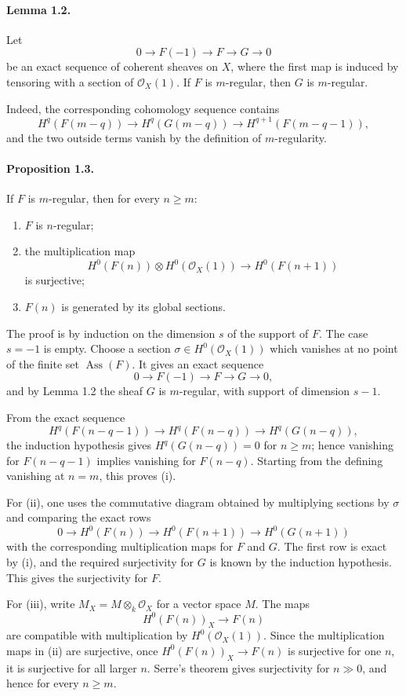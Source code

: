 \documentclass[12pt]{article}
\newcommand{\cO}{\mathcal O}
\newcommand{\longto}{\longrightarrow}
\begin{document}
\paragraph{Lemma 1.2.}
Let
\[
0\to F(-1)\to F\to G\to0
\]
be an exact sequence of coherent sheaves on $X$, where the first map is induced by tensoring with a section of $\cO_X(1)$. If $F$ is $m$-regular, then $G$ is $m$-regular.

Indeed, the corresponding cohomology sequence contains
\[
H^q(F(m-q))\to H^q(G(m-q))\to H^{q+1}(F(m-q-1)),
\]
and the two outside terms vanish by the definition of $m$-regularity.

\paragraph{Proposition 1.3.}
If $F$ is $m$-regular, then for every $n\geq m$:
\begin{enumerate}[label=\roman*)]
\item $F$ is $n$-regular;
\item the multiplication map
\[
H^0(F(n))\otimes H^0(\cO_X(1))\longto H^0(F(n+1))
\]
is surjective;
\item $F(n)$ is generated by its global sections.
\end{enumerate}

The proof is by induction on the dimension $s$ of the support of $F$. The case $s=-1$ is empty. Choose a section $\sigma\in H^0(\cO_X(1))$ which vanishes at no point of the finite set $\operatorname{Ass}(F)$. It gives an exact sequence
\[
0\to F(-1)\to F\to G\to0,
\]
and by Lemma 1.2 the sheaf $G$ is $m$-regular, with support of dimension $s-1$.

From the exact sequence
\[
H^q(F(n-q-1))\to H^q(F(n-q))\to H^q(G(n-q)),
\]
the induction hypothesis gives $H^q(G(n-q))=0$ for $n\geq m$; hence vanishing for $F(n-q-1)$ implies vanishing for $F(n-q)$. Starting from the defining vanishing at $n=m$, this proves (i).

For (ii), one uses the commutative diagram obtained by multiplying sections by $\sigma$ and comparing the exact rows
\[
0\to H^0(F(n))\to H^0(F(n+1))\to H^0(G(n+1))
\]
with the corresponding multiplication maps for $F$ and $G$. The first row is exact by (i), and the required surjectivity for $G$ is known by the induction hypothesis. This gives the surjectivity for $F$.

For (iii), write $M_X=M\otimes_k\cO_X$ for a vector space $M$. The maps
\[
H^0(F(n))_X\longto F(n)
\]
are compatible with multiplication by $H^0(\cO_X(1))$. Since the multiplication maps in (ii) are surjective, once $H^0(F(n))_X\to F(n)$ is surjective for one $n$, it is surjective for all larger $n$. Serre's theorem gives surjectivity for $n\gg0$, and hence for every $n\geq m$.
\end{document}
